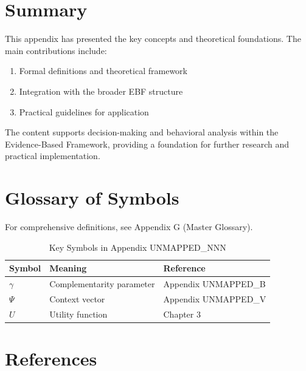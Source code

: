\section{Summary}
\label{sec:nnn-summary}

This appendix has presented the key concepts and theoretical foundations.
The main contributions include:

\begin{enumerate}
    \item Formal definitions and theoretical framework
    \item Integration with the broader EBF structure
    \item Practical guidelines for application
\end{enumerate}

The content supports decision-making and behavioral analysis within the
Evidence-Based Framework, providing a foundation for further research
and practical implementation.


\section{Glossary of Symbols}
\label{sec:nnn-glossary}

For comprehensive definitions, see Appendix G (Master Glossary).

\begin{table}[htbp]
\centering
\caption{Key Symbols in Appendix UNMAPPED_NNN}
\begin{tabular}{lll}
\toprule
\textbf{Symbol} & \textbf{Meaning} & \textbf{Reference} \\
\midrule
$\gamma$ & Complementarity parameter & Appendix UNMAPPED_B \\
$\Psi$ & Context vector & Appendix UNMAPPED_V \\
$U$ & Utility function & Chapter 3 \\
\bottomrule
\end{tabular}
\end{table}


\section{References}
\label{sec:references}

